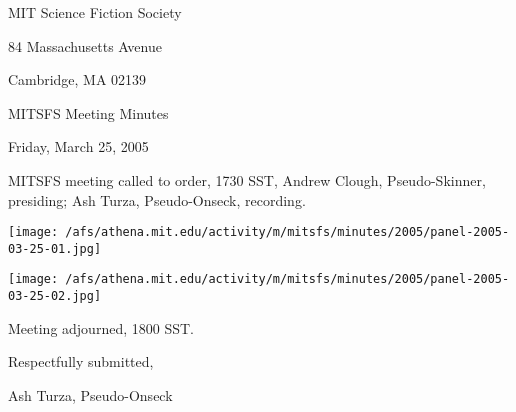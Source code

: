 \documentclass[10pt]{article}
\begin{document}
\begin{center}

MIT Science Fiction Society 

84 Massachusetts Avenue

Cambridge, MA 02139

\vspace{12pt}

MITSFS Meeting Minutes 

Friday, March 25, 2005

\end{center}
 
\vspace{18pt}

\setlength{\parskip}{6pt}

\noindent
MITSFS meeting called to order, 1730 SST, Andrew Clough, Pseudo-Skinner, presiding; Ash Turza,  Pseudo-Onseck, recording.

\texttt{[image: /afs/athena.mit.edu/activity/m/mitsfs/minutes/2005/panel-2005-03-25-01.jpg]} 

\texttt{[image: /afs/athena.mit.edu/activity/m/mitsfs/minutes/2005/panel-2005-03-25-02.jpg]} 

\vspace{12pt}

\noindent
Meeting adjourned, 1800 SST.

\vspace{18pt}

\centerline{Respectfully submitted,}
\centerline{Ash Turza, Pseudo-Onseck}
\end{document}
